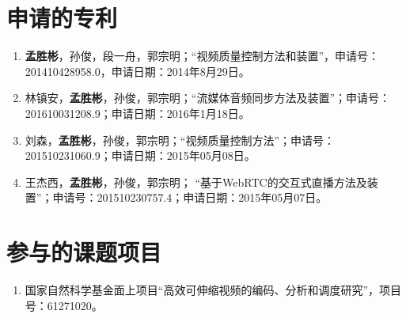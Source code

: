 \section*{申请的专利}
\begin{enumerate}
	\item \textbf{孟胜彬}，孙俊，段一舟，郭宗明；“视频质量控制方法和装置”，申请号：201410428958.0，申请日期：2014年8月29日。
	\item 林镇安，\textbf{孟胜彬}，孙俊，郭宗明；“流媒体音频同步方法及装置”；申请号：201610031208.9；申请日期：2016年1月18日。
	\item 刘森，\textbf{孟胜彬}，孙俊，郭宗明；“视频质量控制方法”；申请号：201510231060.9；申请日期：2015年05月08日。
	\item 王杰西，\textbf{孟胜彬}，孙俊，郭宗明； “基于WebRTC的交互式直播方法及装置”；申请号：201510230757.4；申请日期：2015年05月07日。
\end{enumerate}

\section*{参与的课题项目}
\begin{enumerate}
	\item 国家自然科学基金面上项目“高效可伸缩视频的编码、分析和调度研究”，项目号：61271020。
\end{enumerate}